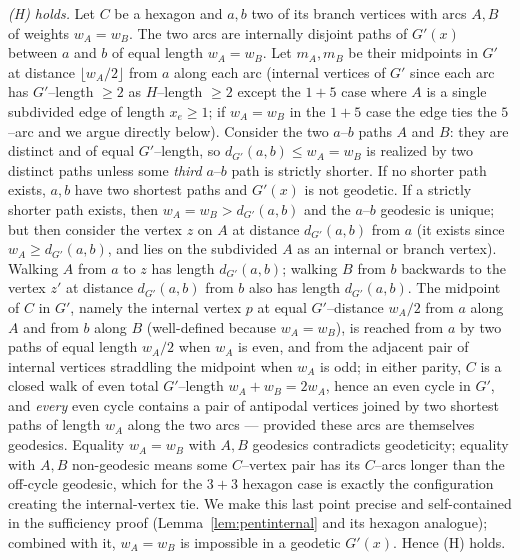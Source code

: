 \documentclass{amsart}
\theoremstyle{definition}
\begin{document}
\emph{(H) holds.} Let $C$ be a hexagon and $a,b$ two of its branch vertices with
arcs $A,B$ of weights $w_A=w_B$. The two arcs are internally disjoint paths of
$G'(x)$ between $a$ and $b$ of equal length $w_A=w_B$. Let $m_A,m_B$ be their
midpoints in $G'$ at distance $\lfloor w_A/2\rfloor$ from $a$ along each arc
(internal vertices of $G'$ since each arc has $G'$--length $\ge2$ as $H$--length
$\ge2$ except the $1{+}5$ case where $A$ is a single subdivided edge of length
$x_e\ge1$; if $w_A=w_B$ in the $1{+}5$ case the edge ties the $5$--arc and we
argue directly below). Consider the two $a$--$b$ paths $A$ and $B$: they are
distinct and of equal $G'$--length, so $d_{G'}(a,b)\le w_A=w_B$ is realized by
two distinct paths unless some \emph{third} $a$--$b$ path is strictly shorter. If
no shorter path exists, $a,b$ have two shortest paths and $G'(x)$ is not
geodetic. If a strictly shorter path exists, then $w_A=w_B>d_{G'}(a,b)$ and the
$a$--$b$ geodesic is unique; but then consider the vertex $z$ on $A$ at distance
$d_{G'}(a,b)$ from $a$ (it exists since $w_A\ge d_{G'}(a,b)$, and lies on the
subdivided $A$ as an internal or branch vertex). Walking $A$ from $a$ to $z$ has
length $d_{G'}(a,b)$; walking $B$ from $b$ backwards to the vertex $z'$ at
distance $d_{G'}(a,b)$ from $b$ also has length $d_{G'}(a,b)$. The midpoint of
$C$ in $G'$, namely the internal vertex $p$ at equal $G'$--distance $w_A/2$ from
$a$ along $A$ and from $b$ along $B$ (well-defined because $w_A=w_B$), is reached
from $a$ by two paths of equal length $w_A/2$ when $w_A$ is even, and from the
adjacent pair of internal vertices straddling the midpoint when $w_A$ is odd; in
either parity, $C$ is a closed walk of even total $G'$--length $w_A+w_B=2w_A$,
hence an even cycle in $G'$, and \emph{every} even cycle contains a pair of
antipodal vertices joined by two shortest paths of length $w_A$ along the two
arcs --- provided these arcs are themselves geodesics. Equality $w_A=w_B$ with
$A,B$ geodesics contradicts geodeticity; equality with $A,B$ non-geodesic means
some $C$--vertex pair has its $C$--arcs longer than the off-cycle geodesic, which
for the $3{+}3$ hexagon case is exactly the configuration creating the
internal-vertex tie. We make this last point precise and self-contained in the
sufficiency proof (Lemma~\ref{lem:pentinternal} and its hexagon analogue);
combined with it, $w_A=w_B$ is impossible in a geodetic $G'(x)$. Hence (H)
holds.
\end{document}
